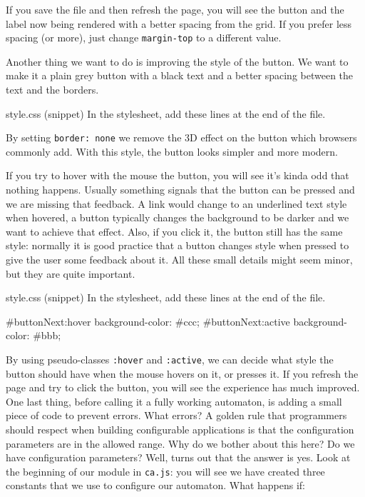 If you save the file and then refresh the page, you will see
the button and the label now being rendered with a better
spacing from the grid. If you prefer less spacing (or more), just change \texttt{margin-top} to a different
value.

Another thing we want to do is improving the style of the button. We want to make it a plain grey button
with a black text and a better spacing between the text and the borders.

\begin{programcode}{style.css (snippet)}
In the stylesheet, add these lines at the end of the file.
\end{programcode}

By setting \texttt{border: none} we remove the 3D effect on the button which browsers commonly add.
With this style, the button looks simpler and more modern.

If you try to hover with the mouse the button, you will see it's kinda odd that nothing happens. Usually
something signals that the button can be pressed and we are missing that feedback. A link would change to
an underlined text style when hovered, a button typically changes the background to be darker and we want to
achieve that effect. Also, if you click it, the button still has the same style: normally it is good
practice that a button changes style when pressed to give the user some feedback about it. All these
small details might seem minor, but they are quite important.

\begin{programcode}{style.css (snippet)}
In the stylesheet, add these lines at the end of the file.
\begin{codecss}
#buttonNext:hover {
  background-color: #ccc;
}
#buttonNext:active {
  background-color: #bbb;
}
\end{codecss}
\end{programcode}

By using pseudo-classes \texttt{:hover} and \texttt{:active}, we can decide what style the button should
have when the mouse hovers on it, or presses it. If you refresh the page and try to click the button, you
will see the experience has much improved.\\

One last thing, before calling it a fully working automaton, is adding a small piece of code to prevent
errors. What errors? A golden rule that programmers should respect when building configurable applications
is that the configuration parameters are in the allowed range. Why do we bother about this here?
Do we have configuration parameters? Well, turns out that the answer is yes. Look at the beginning
of our module in \texttt{ca.js}: you will see we have created three constants that we use to configure
our automaton. What happens if:

